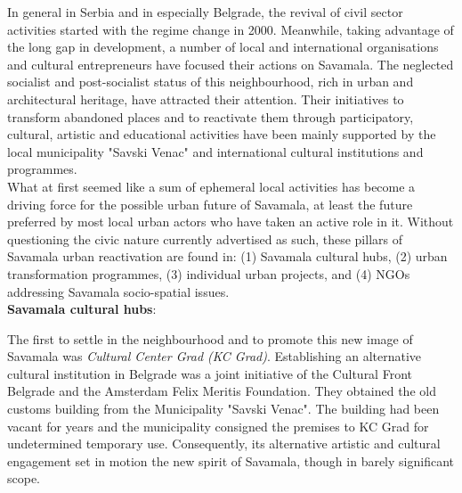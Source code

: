 \documentclass[11pt]{report}
\begin{document}
{{{{In general in Serbia and in especially Belgrade, the revival of civil sector activities started with the regime change in 2000. Meanwhile, taking advantage of the long gap in development, a number of local and international organisations and cultural entrepreneurs have focused their actions on Savamala. The neglected socialist and post-socialist status of this neighbourhood, rich in urban and architectural heritage, have attracted their attention. Their initiatives to transform abandoned places and to reactivate them through participatory, cultural, artistic and educational activities have been mainly supported by the local municipality  "Savski Venac" and international cultural institutions and programmes.
\\

What at first seemed like a sum of ephemeral local activities has become a driving force for the possible urban future of Savamala, at least the future preferred by most local urban actors who have taken an active role in it.
Without questioning the civic nature currently advertised as such, these pillars of Savamala urban reactivation are found in:
(1) Savamala cultural hubs,
(2) urban transformation programmes,
(3) individual urban projects, 
and
(4) NGOs addressing Savamala socio-spatial issues.
\\

\textbf{Savamala cultural hubs}: 

The first to settle in the neighbourhood and to promote this new image of Savamala was \textit{Cultural Center Grad (KC Grad)}. Establishing an alternative cultural institution in Belgrade was a joint initiative of the Cultural Front Belgrade and the Amsterdam Felix Meritis Foundation.
They obtained the old customs building from the Municipality "Savski Venac".
The building had been vacant for years and the municipality consigned the premises to KC Grad for undetermined temporary use. Consequently, its alternative artistic and cultural engagement set in motion the new spirit of Savamala, though in barely significant scope.
\\

}}}}
\end{document}
